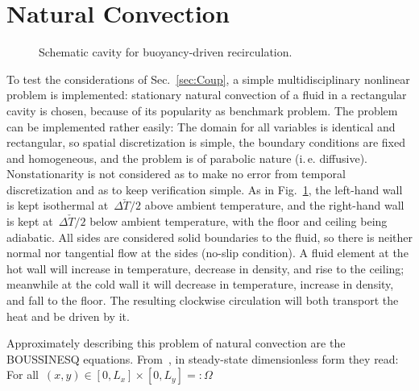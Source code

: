 \documentclass[10pt, ngerman, english,
twoside, open=right,
numbers=noenddot,
declaration=section,
abstract=section,
abstract=multiple,
abstract=notoc,
declaration=notoc,
cd=pale, 
chapterprefix=off, 
chapterpage=false, 
headingsvskip=-10em,
cdgeometry=custom, 
slantedgreek=on,
cdmath=on, 
cdfont=on,
ttfont=false,
mathswap=off,
]{tudscrreprt}
\numberwithin{equation}{chapter}
\renewcommand{\textsc}[1]{\uppercase{\mbox{#1}}}
\newcommand{\sidenote}[1]{
  \leavevmode %
  \marginpar{\hyphenpenalty=1000 \flushleft{\textcolor{HKS41}{#1}}}}
\begin{document}
\section{Natural Convection}\label{sec:Boussinesq_equations}
\begin{figure}
\centering	
\vspace*{-1em}

\caption{Schematic cavity for buoyancy-driven recirculation.}\label{fig:Boussinesq_cavity}
\end{figure}
\sidenote{Problem}To test the considerations of Sec.~\ref{sec:Coup}, a simple multidisciplinary nonlinear problem is implemented: stationary natural convection of a fluid in a rectangular cavity is chosen, because of its popularity as benchmark problem. 
The problem can be implemented rather easily: The domain for all variables is identical and rectangular, so spatial discretization is simple, the boundary conditions are fixed and homogeneous, and the problem is of parabolic nature (i.\,e. diffusive).
Nonstationarity is not considered as to make no error from temporal discretization and as to keep verification simple.
As in Fig.~\ref{fig:Boussinesq_cavity}, the left-hand wall is kept isothermal at~$\Delta\check{T}/2$ above ambient temperature, and the right-hand wall is kept at~$\Delta\check{T}/2$ below ambient temperature, with the floor and ceiling being adiabatic. All sides are considered solid boundaries to the fluid, so there is neither normal nor tangential flow at the sides (no-slip condition). A fluid element at the hot wall will increase in temperature, decrease in density, and rise to the ceiling; meanwhile at the cold wall it will decrease in temperature, increase in density, and fall to the floor. The resulting clockwise circulation will both transport the heat and be driven by it.\par
\sidenote{Continuous Equations}Approximately describing this problem of natural convection are the \textsc{Boussinesq} equations. From~\cite[see][Sec.~1.6]{Ferziger}, in steady-state dimensionless form they read:
For all~$(x,y) \in [0, L_x]\times[0,L_y]=:\Omega$%
\end{document}
